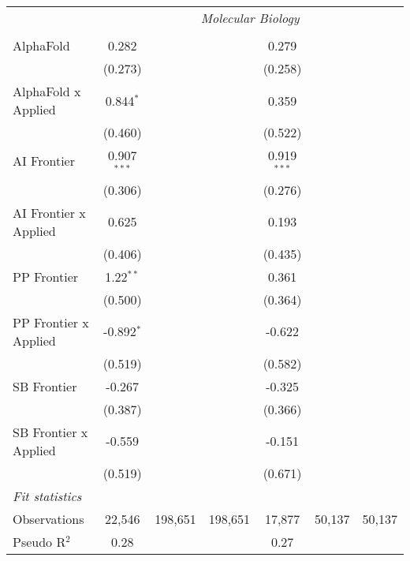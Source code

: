 \begin{tabular}{lcccccc}
 & \multicolumn{6}{c}{\textit{Molecular Biology}} \\ \\
   AlphaFold             & 0.282         &         &         & 0.279         &        &   \\   
                         & (0.273)       &         &         & (0.258)       &        &   \\   
   AlphaFold x Applied   & 0.844$^{*}$   &         &         & 0.359         &        &   \\   
                         & (0.460)       &         &         & (0.522)       &        &   \\   
   AI Frontier           & 0.907$^{***}$ &         &         & 0.919$^{***}$ &        &   \\   
                         & (0.306)       &         &         & (0.276)       &        &   \\   
   AI Frontier x Applied & 0.625         &         &         & 0.193         &        &   \\   
                         & (0.406)       &         &         & (0.435)       &        &   \\   
   PP Frontier           & 1.22$^{**}$   &         &         & 0.361         &        &   \\   
                         & (0.500)       &         &         & (0.364)       &        &   \\   
   PP Frontier x Applied & -0.892$^{*}$  &         &         & -0.622        &        &   \\   
                         & (0.519)       &         &         & (0.582)       &        &   \\   
   SB Frontier           & -0.267        &         &         & -0.325        &        &   \\   
                         & (0.387)       &         &         & (0.366)       &        &   \\   
   SB Frontier x Applied & -0.559        &         &         & -0.151        &        &   \\   
                         & (0.519)       &         &         & (0.671)       &        &   \\   
   \midrule
   \emph{Fit statistics}\\
   Observations          & 22,546        & 198,651 & 198,651 & 17,877        & 50,137 & 50,137\\  
   Pseudo R$^2$          & 0.28          &         &         & 0.27          &        & \\  
   

\end{tabular}
